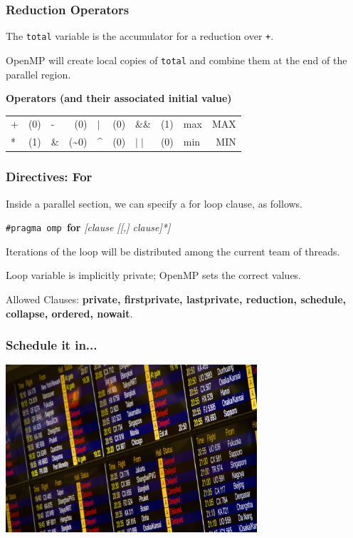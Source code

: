 \begin{frame}
\frametitle{Reduction Operators}

The {\tt total} variable is the accumulator for a
reduction over {\tt +}. 

OpenMP will create local copies of {\tt total} and 
combine them at the end of the parallel region.

{\bf Operators (and their associated initial value)}
  \begin{center}
    \begin{tabular}{l r | l r | l r | l r | l r}
      + & (0) & -  &  (0) &    $\mid$ & (0) & \&\& & (1) & max & MAX\\
      * & (1) & \& & (\~{}0) & \^{} & (0) &   $\mid\mid$ & (0) & min & MIN\\ 
    \end{tabular}
  \end{center}
\end{frame}


\begin{frame}
\frametitle{Directives: For}

Inside a parallel section, we can
specify a for loop clause, as follows.

  \begin{center}
    {\tt \#pragma omp }{\bf for} {\it [clause [[,] clause]*]}
  \end{center}

    Iterations of the loop will be distributed among the
      current team of threads.
      
    Loop variable is implicitly private; OpenMP sets the
      correct values.

  Allowed Clauses: {\bf private, firstprivate, lastprivate, reduction, schedule,
    collapse, ordered, nowait}.

\end{frame}


\begin{frame}
\frametitle{Schedule it in...}

\begin{center}
	\includegraphics[width=0.7\textwidth]{images/schedule.jpeg}
\end{center}

\end{frame}



